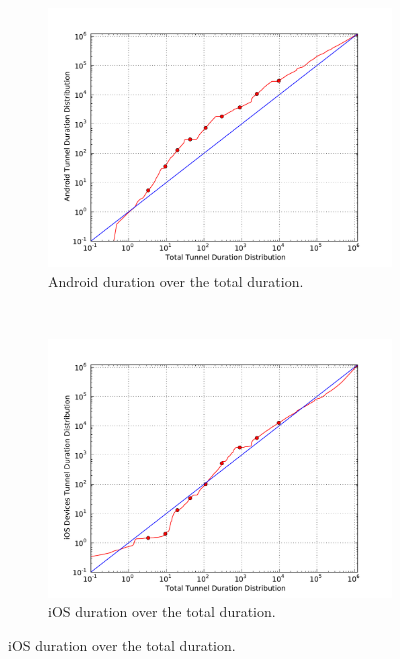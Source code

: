 \begin{figure}[htb]
        \centering
        \begin{subfigure}[b]{0.50\textwidth}
            \centering
            \includegraphics[width=\textwidth]{images/qq-total-vs-android.pdf}
            \caption{Android duration over the total duration.}
            \label{c4:fig:qq-total-vs-android}
        \end{subfigure}%
        ~
        \begin{subfigure}[b]{0.50\textwidth}
            \centering
            \includegraphics[width=\textwidth]{images/qq-total-vs-ios.pdf}
            \caption{iOS duration over the total duration.}
            \label{c4:fig:qq-total-vs-ios}
        \end{subfigure}


\end{figure}
